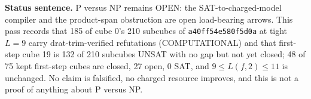 \documentclass[11pt]{article}
\begin{document}
\bigskip
\noindent\textbf{Status sentence.} P versus NP remains OPEN: the SAT-to-charged-model compiler and the product-span obstruction are open load-bearing arrows. This pass records that 185 of cube 0's 210 subcubes of \texttt{a40ff54e580f5d0a} at tight $L=9$ carry drat-trim-verified refutations (COMPUTATIONAL) and that first-step cube 19 is 132 of 210 subcubes UNSAT with no gap but not yet closed; 48 of 75 kept first-step cubes are closed, 27 open, 0 SAT, and $9\le L(f,2)\le 11$ is unchanged. No claim is falsified, no charged resource improves, and this is not a proof of anything about P versus NP.
\end{document}
